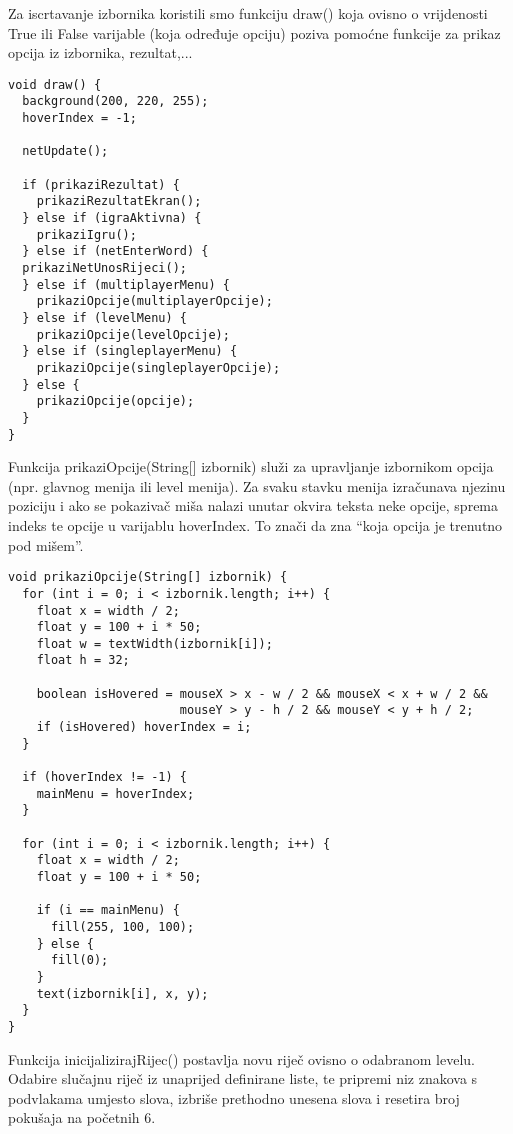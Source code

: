 \documentclass{article}
\begin{document}
Za iscrtavanje izbornika koristili smo funkciju draw() koja ovisno o vrijdenosti True ili False varijable (koja određuje opciju) poziva pomoćne funkcije za prikaz opcija iz izbornika, rezultat,...

\begin{verbatim}
void draw() {
  background(200, 220, 255);
  hoverIndex = -1;

  netUpdate();

  if (prikaziRezultat) {
    prikaziRezultatEkran();
  } else if (igraAktivna) {
    prikaziIgru();
  } else if (netEnterWord) {
  prikaziNetUnosRijeci(); 
  } else if (multiplayerMenu) {
    prikaziOpcije(multiplayerOpcije);
  } else if (levelMenu) {
    prikaziOpcije(levelOpcije);
  } else if (singleplayerMenu) {
    prikaziOpcije(singleplayerOpcije);
  } else {
    prikaziOpcije(opcije);
  }
}
\end{verbatim}

Funkcija prikaziOpcije(String[] izbornik) služi za upravljanje izbornikom opcija (npr. glavnog menija ili level menija). Za svaku stavku menija izračunava njezinu poziciju i ako se pokazivač miša nalazi unutar okvira teksta neke opcije, sprema indeks te opcije u varijablu hoverIndex. To znači da zna “koja opcija je trenutno pod mišem”.

\begin{verbatim}
void prikaziOpcije(String[] izbornik) {
  for (int i = 0; i < izbornik.length; i++) {
    float x = width / 2;
    float y = 100 + i * 50;
    float w = textWidth(izbornik[i]);
    float h = 32;

    boolean isHovered = mouseX > x - w / 2 && mouseX < x + w / 2 &&
                        mouseY > y - h / 2 && mouseY < y + h / 2;
    if (isHovered) hoverIndex = i;
  }

  if (hoverIndex != -1) {
    mainMenu = hoverIndex;
  }

  for (int i = 0; i < izbornik.length; i++) {
    float x = width / 2;
    float y = 100 + i * 50;

    if (i == mainMenu) {
      fill(255, 100, 100);
    } else {
      fill(0);
    }
    text(izbornik[i], x, y);
  }
}
\end{verbatim}

Funkcija inicijalizirajRijec() postavlja novu riječ ovisno o odabranom levelu. Odabire slučajnu riječ iz unaprijed definirane liste, te pripremi niz znakova s podvlakama umjesto slova, izbriše prethodno unesena slova i resetira broj pokušaja na početnih 6.
\end{document}
